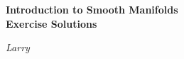 \begin{titlepage}
    \centering  %
    \vspace*{5cm}  %

    {\Huge\bfseries Introduction to Smooth Manifolds\\Exercise Solutions\par} %
    \vspace{2em}
    {\Large\itshape Larry\par}  %

    \vfill  %
\end{titlepage}